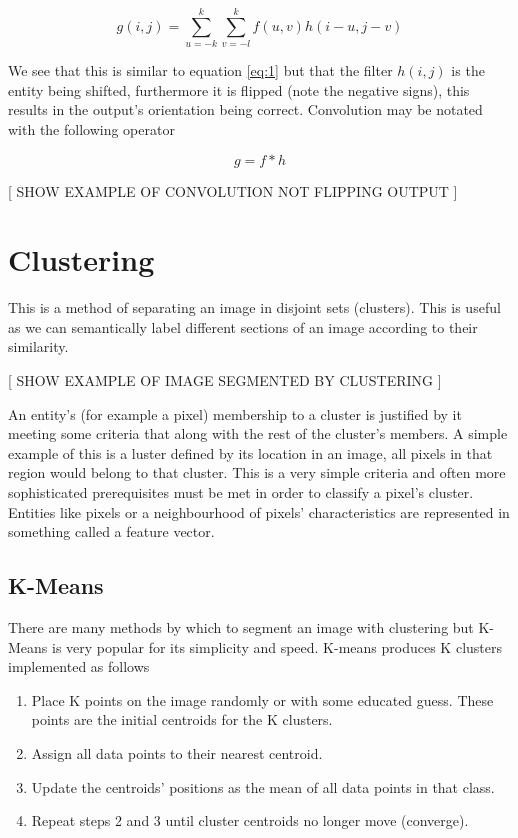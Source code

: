 \[ g(i,j) = \sum_{u=-k}^{k}\sum_{v = -l}^{k}f(u,v)h(i-u,j-v)\]

We see that this is similar to equation \ref{eq:1} but that the filter $h(i,j)$ is the entity being shifted, furthermore it is flipped (note the negative signs), this results in the output's orientation being correct. Convolution may be notated with the following operator

\[g = f \ast h\]

[ SHOW EXAMPLE OF CONVOLUTION NOT FLIPPING OUTPUT ]


\section{Clustering}
This is a method of separating an image in disjoint sets (clusters). This is useful as we can semantically label different sections of an image according to their similarity.

[ SHOW EXAMPLE OF IMAGE SEGMENTED BY CLUSTERING ]

An entity’s  (for example a pixel) membership to a cluster is justified by it meeting some criteria that along with the rest of the cluster’s members. A simple example of this is a luster defined by its location in an image, all pixels in that region would belong to that cluster. This is a very simple criteria and often more sophisticated prerequisites must be met in order to classify a pixel's cluster. Entities like pixels or a neighbourhood of pixels' characteristics are represented in something called a feature vector.


\subsection{K-Means}
There are many methods by which to segment an image with clustering but K-Means is very popular for its simplicity and speed. K-means produces K clusters implemented as follows

    \begin{enumerate}
    \itemsep0em
        \item Place K points on the image randomly or with some educated guess. These points are the initial centroids for the K clusters.  
        \item Assign all data points to their nearest centroid.
        \item Update the centroids' positions as the mean of all data points in that class.
        \item Repeat steps 2 and 3 until cluster centroids no longer move (converge). 
    \end{enumerate}

